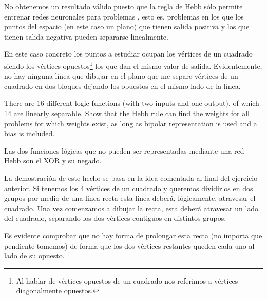 \begin{problem}[1]
No obtenemos un resultado válido puesto que la regla de Hebb sólo permite entrenar redes neuronales para problemas , esto es, problemas en los que los puntos del espacio (en este caso un plano) que tienen salida positiva y los que tienen salida negativa pueden separarse linealmente.

En este caso concreto los puntos a estudiar ocupan los vértices de un cuadrado siendo los vértices opuestos\footnote{Al hablar de vértices opuestos de un cuadrado nos referimos a vértices diagonalmente opuestos.} los que dan el mismo valor de salida. Evidentemente, no hay ninguna linea que dibujar en el plano que me separe vértices de un cuadrado en dos bloques dejando los opuestos en el mismo lado de la línea.


\end{problem}

\begin{problem}[2]
There are 16 different logic functions (with two inputs and one output), of which 14
are linearly separable. Show that the Hebb rule can find the weights for all problems
for which weights exist, as long as bipolar representation is used and a bias is included.

\solution

Las dos funciones lógicas que no pueden ser representadas mediante una red Hebb son el XOR y su negado.

La demostración de este hecho se basa en la idea comentada al final del ejercicio anterior. Si tenemos los 4 vértices de un cuadrado y queremos dividirlos en dos grupos por medio de una linea recta esta linea deberá, lógicamente, atravesar el cuadrado. Una vez comenzamos a dibujar la recta, esta deberá atravesar un lado del cuadrado, separando los dos vértices contiguos en distintos grupos.

Es evidente comprobar que no hay forma de prolongar esta recta (no importa que pendiente tomemos) de forma que los dos vértices restantes queden cada uno al lado de su opuesto.

\end{problem}

